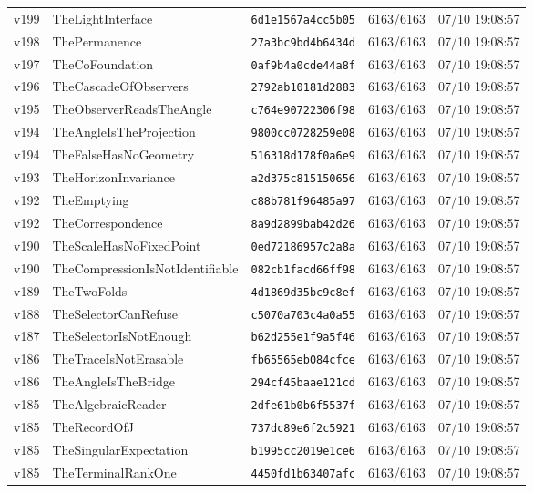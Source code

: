 \documentclass[11pt]{article}
\theoremstyle{definition}\newtheorem{deriv}{Derivação}
\begin{document}
{\begin{longtable}{@{}lllll@{}}
v199 & TheLightInterface & \texttt{6d1e1567a4cc5b05} & 6163/6163 & 07/10 19:08:57 \\
v198 & ThePermanence & \texttt{27a3bc9bd4b6434d} & 6163/6163 & 07/10 19:08:57 \\
v197 & TheCoFoundation & \texttt{0af9b4a0cde44a8f} & 6163/6163 & 07/10 19:08:57 \\
v196 & TheCascadeOfObservers & \texttt{2792ab10181d2883} & 6163/6163 & 07/10 19:08:57 \\
v195 & TheObserverReadsTheAngle & \texttt{c764e90722306f98} & 6163/6163 & 07/10 19:08:57 \\
v194 & TheAngleIsTheProjection & \texttt{9800cc0728259e08} & 6163/6163 & 07/10 19:08:57 \\
v194 & TheFalseHasNoGeometry & \texttt{516318d178f0a6e9} & 6163/6163 & 07/10 19:08:57 \\
v193 & TheHorizonInvariance & \texttt{a2d375c815150656} & 6163/6163 & 07/10 19:08:57 \\
v192 & TheEmptying & \texttt{c88b781f96485a97} & 6163/6163 & 07/10 19:08:57 \\
v192 & TheCorrespondence & \texttt{8a9d2899bab42d26} & 6163/6163 & 07/10 19:08:57 \\
v190 & TheScaleHasNoFixedPoint & \texttt{0ed72186957c2a8a} & 6163/6163 & 07/10 19:08:57 \\
v190 & TheCompressionIsNotIdentifiable & \texttt{082cb1facd66ff98} & 6163/6163 & 07/10 19:08:57 \\
v189 & TheTwoFolds & \texttt{4d1869d35bc9c8ef} & 6163/6163 & 07/10 19:08:57 \\
v188 & TheSelectorCanRefuse & \texttt{c5070a703c4a0a55} & 6163/6163 & 07/10 19:08:57 \\
v187 & TheSelectorIsNotEnough & \texttt{b62d255e1f9a5f46} & 6163/6163 & 07/10 19:08:57 \\
v186 & TheTraceIsNotErasable & \texttt{fb65565eb084cfce} & 6163/6163 & 07/10 19:08:57 \\
v186 & TheAngleIsTheBridge & \texttt{294cf45baae121cd} & 6163/6163 & 07/10 19:08:57 \\
v185 & TheAlgebraicReader & \texttt{2dfe61b0b6f5537f} & 6163/6163 & 07/10 19:08:57 \\
v185 & TheRecordOfJ & \texttt{737dc89e6f2c5921} & 6163/6163 & 07/10 19:08:57 \\
v185 & TheSingularExpectation & \texttt{b1995cc2019e1ce6} & 6163/6163 & 07/10 19:08:57 \\
v185 & TheTerminalRankOne & \texttt{4450fd1b63407afc} & 6163/6163 & 07/10 19:08:57 \\

\end{longtable}}
\end{document}
